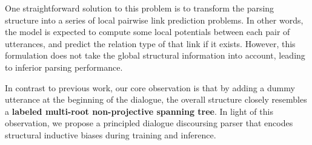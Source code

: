 \documentclass[11pt]{article}
\begin{document}
\begin{table*}[ht!]
\caption{This is the comparison between different dialogue discourse parsers. Our method is designed with structured encoding and decoding processes. Furthermore, the links and relations are learned and predicted jointly. Finally, our method does not rely on human-designed features, hence enjoys better robustness.}
\label{tab:comparison}
\end{table*}


One straightforward solution to this problem is to transform the parsing structure into a series of local pairwise link prediction problems. In other words, the model is expected to compute some local potentials between each pair of utterances, and predict the relation type of that link if it exists. However, this formulation does not take the global structural information into account, leading to inferior parsing performance.

In contrast to previous work, our core observation is that by adding a dummy utterance at the beginning of the dialogue, the overall structure closely resembles a \textbf{labeled multi-root non-projective spanning tree}.
In light of this observation, we propose a principled dialogue discoursing parser that encodes structural inductive biases during training and inference.
\end{document}

